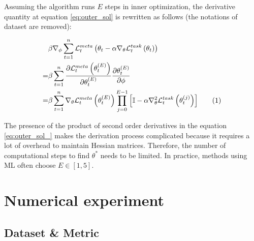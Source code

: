 \documentclass[aps,prb,groupedaddress,twocolumn,showpacs,dvipdfmx,superscriptaddress,pdftex]{revtex4-2}
\newcommand\numberthis{\addtocounter{equation}{1}\tag{\theequation}}
\begin{document}
Assuming the algorithm runs $E$ steps in inner optimization, the derivative quantity at equation \ref{eq:outer_sol} is rewritten as follows (the notations of dataset are removed):

\begin{align*}
    &\beta \nabla_{\phi} \sum_{t=1}^n{\mathcal{L}^{meta}_t \left( \theta_t - \alpha \nabla_{\theta} \mathcal{L}^{task}_t\left( \theta_t \right) \right)}\\
    = &\beta \sum_{t=1}^n{ \frac{\partial \mathcal{L}^{meta}_t\left(\theta_t^{(E)}\right)}{\partial \theta_t^{(E)}} \frac{\partial \theta_t^{(E)}}{\partial \phi}}\\
    = &\beta \sum_{t=1}^n{ \nabla_{\theta} \mathcal{L}^{meta}_t\left(\theta_t^{(E)}\right) \prod_{j=0}^{E-1} {\left[\mathbb{I} - \alpha\nabla^2_{\theta}\mathcal{L}^{task}_{t}\left(\theta_t^{(j)}\right)\right]}} \numberthis
    \label{eq:outer_sol_}
\end{align*}


The presence of the product of second order derivatives in the equation \ref{eq:outer_sol_} makes the derivation process complicated because it requires a lot of overhead to maintain Hessian matrices. Therefore, the number of computational steps to find $\theta^*$ needs to be limited. In practice, methods using ML \citep{fallah2020personalized, chen2018federated, nguyen2022meta,finn2017model, li2017meta} often choose $E\in [1,5]$.

\section{Numerical experiment}
\label{sec.experiment}

\subsection{Dataset \& Metric}
\end{document}
